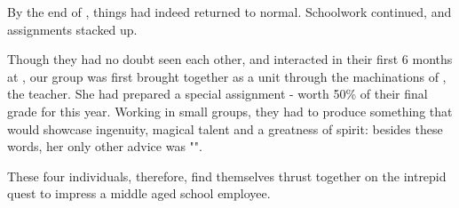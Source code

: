 \documentclass[oneside, 9pt,english]{extbook}
\begin{document}
	By the end of , things had indeed returned to normal. Schoolwork continued, and assignments stacked up. 
	
	Though they had no doubt seen each other, and interacted in their first 6 months at , our group was first brought together as a unit through the machinations of , the  teacher. She had prepared a special assignment - worth 50\% of their final grade for this year. Working in small groups, they had to produce something that would showcase ingenuity, magical talent and a greatness of spirit: besides these words, her only other advice was "".
	
	These four individuals, therefore, find themselves thrust together on the intrepid quest to impress a middle aged school employee. 
\end{document}
